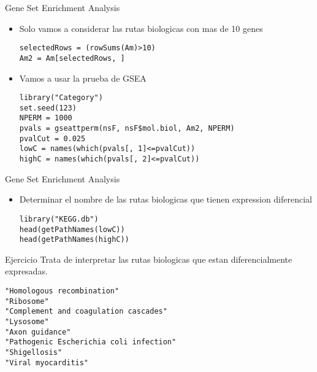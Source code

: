 \documentclass{beamer}
\begin{document}
\begin{frame}[fragile]{Gene Set Enrichment Analysis}
\begin{itemize}
\item Solo vamos a considerar las rutas biologicas con mas de 10 genes
\begin{verbatim}
selectedRows = (rowSums(Am)>10)
Am2 = Am[selectedRows, ]
\end{verbatim}
\item Vamos a usar la prueba de GSEA
\begin{verbatim}
library("Category")
set.seed(123)
NPERM = 1000
pvals = gseattperm(nsF, nsF$mol.biol, Am2, NPERM)
pvalCut = 0.025
lowC = names(which(pvals[, 1]<=pvalCut))
highC = names(which(pvals[, 2]<=pvalCut))
\end{verbatim}
\end{itemize}
\end{frame}

\begin{frame}[fragile]{Gene Set Enrichment Analysis}
\begin{itemize}
\item Determinar el nombre de las rutas biologicas que tienen expression diferencial
\begin{verbatim}
library("KEGG.db")
head(getPathNames(lowC))
head(getPathNames(highC))
\end{verbatim}
\end{itemize}
\end{frame}

\begin{frame}[fragile]
\begin{block}{Ejercicio}
Trata de interpretar las rutas biologicas que estan diferencialmente expresadas.
\begin{verbatim}
"Homologous recombination"
"Ribosome"
"Complement and coagulation cascades"
"Lysosome"
"Axon guidance"
"Pathogenic Escherichia coli infection"
"Shigellosis"
"Viral myocarditis"
\end{verbatim}
\end{block}
\end{frame}
\end{document}
